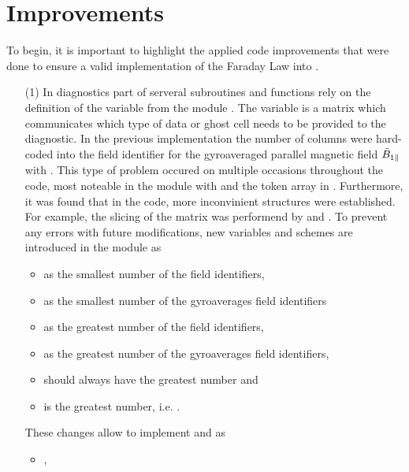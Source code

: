 \section{Improvements}
\label{sec:improvements}

To begin, it is important to highlight the applied code improvements that were done to ensure a valid implementation of the Faraday Law into {\gkw}.
\begin{enumerate}
    \item[(1)] In diagnostics part of {\gkw} serveral subroutines and functions rely on the definition of the variable  from the module . The variable  is a matrix which communicates which type of data or ghost cell needs to be provided to the diagnostic. In the previous implementation the number of columns were hard-coded into the field identifier for the gyroaveraged parallel magnetic field $\bar{B}_{1\parallel}$ with . This type of problem occured on multiple occasions throughout the code, most noteable in the module  with  and the token array in . Furthermore, it was found that in the code, more inconvinient structures were established. For example, the slicing of the  matrix was performend by  and . To prevent any errors with future modifications, new variables and schemes are introduced in the module  as
    \begin{itemize}
        \item {} as the smallest number of the field identifiers, 
        \item {} as the smallest number of the gyroaverages field identifiers
        \item {} as the greatest number of the field identifiers, 
        \item {} as the greatest number of the gyroaverages field identifiers,
        \item {} should always have the greatest number and
        \item {} is the greatest number, i.e. .
    \end{itemize}
    These changes allow to implement  and  as 
    \begin{itemize}
        \item {}, 

\end{itemize}
\end{enumerate}
